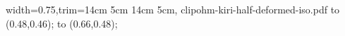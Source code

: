 \documentclass[margin=1pt]{standalone}
\begin{document}
\renewcommand{\arraystretch}{1} %
\begin{annotationimage}{width=0.75\textwidth,trim={14cm 5cm 14cm 5cm}, clip}{ohm-kiri-half-deformed-iso.pdf}
 \draw[annotation left = {\begin{tabular}{r} Coupling\\Beam \end{tabular} at 0.46}] to (0.48,0.46);
 \draw[annotation right = {\begin{tabular}{l} Buckling\\Beam\end{tabular} at 0.48}] to (0.66,0.48);
\end{annotationimage}
\renewcommand{\arraystretch}{1.5} %
\end{document}
